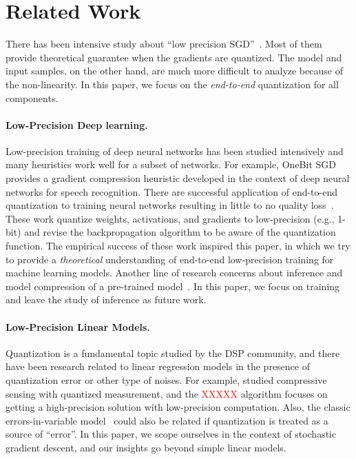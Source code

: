 \documentclass{article}
\begin{document}
\section{Related Work} 

There has been intensive study about ``low precision SGD''~\cite{DeSa:NIPS:2015,Alistarh:2016:ArXiv}. 
Most of them provide
theoretical guarantee when the gradients are quantized.
The model and input samples, on the other hand, are much more difficult
to analyze because of the non-linearity. In this paper, 
we
focus on the {\em end-to-end}
quantization for all components.

\vspace{-1em}
\paragraph{Low-Precision Deep learning.}

Low-precision training of deep neural networks has been studied
intensively and many heuristics work well for a subset of networks.
For example, OneBit SGD~\cite{Frank:2014:Interspeech} provides
a gradient compression heuristic developed in the context of deep 
neural networks for speech recognition. There are successful 
application of end-to-end quantization to training neural networks
resulting in little to no quality loss~\cite{hubara2016quantized,
rastegari2016xnor,zhou2016dorefa,miyashita2016convolutional,li2016ternary,gupta2015deep}. These work quantize weights, activations, and gradients 
to low-precision (e.g., 1-bit) and revise the backpropagation 
algorithm to be aware of the quantization function.
The empirical success of these work inspired this paper, in which we try
to provide a {\em theoretical} understanding of end-to-end low-precision
training for machine learning models.
Another line of research concerns about inference and model
compression of a pre-trained model~\cite{vanhoucke2011improving,gong2014compressing,Han:2016:ICLR,lin2016fixed,kim2016bitwise,kim2015compression,wu2016quantized}.
In this paper, we focus on training and leave the study of
inference as future work.

\vspace{-1em}
\paragraph{Low-Precision Linear Models.}

Quantization is a fundamental topic studied by the
DSP community, and there have been research related to
linear regression models in the presence of quantization
error or other type of noises. For example,
\citet{Gopi:2013:ICML} studied compressive sensing
with quantized measurement, and the \textcolor{red}{XXXXX}
algorithm focuses on getting a high-precision solution
with low-precision computation. Also, the
classic errors-in-variable model~\cite{Hall:2008:Book}
could also be related if quantization is treated 
as a source of ``error''. In this paper, we scope
ourselves in the context of stochastic gradient descent, 
and our insights go beyond simple linear models.
\end{document}
